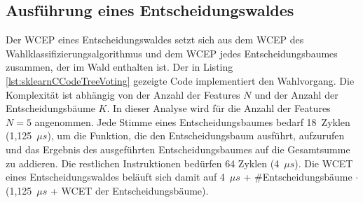 \subsection{Ausführung eines Entscheidungswaldes}
Der WCEP eines Entscheidungswaldes setzt sich aus dem WCEP des Wahlklassifizierungsalgorithmus und dem WCEP jedes Entscheidungsbaumes zusammen, der im Wald enthalten ist.
\newline
\newline
Der in Listing \ref{lst:sklearnCCodeTreeVoting} gezeigte Code implementiert den Wahlvorgang. Die Komplexität ist abhängig von der Anzahl der Features $N$ und der Anzahl der Entscheidungsbäume $K$. In
dieser Analyse wird für die Anzahl der Features $N=5$ angenommen.
Jede Stimme eines Entscheidungsbaumes bedarf 18~Zyklen (1,125~$\mu s$), um die Funktion, die den Entscheidungsbaum ausführt, aufzurufen und das Ergebnis des ausgeführten Entscheidungsbaumes auf die Gesamtsumme zu addieren.
Die restlichen Instruktionen bedürfen 64 Zyklen (4~$\mu s$).
\newline
\newline
Die WCET eines Entscheidungswaldes beläuft sich damit auf 4~$\mu s$ + \#Entscheidungsbäume $\cdot$ (1,125~$\mu s$ + WCET der Entscheidungsbäume).